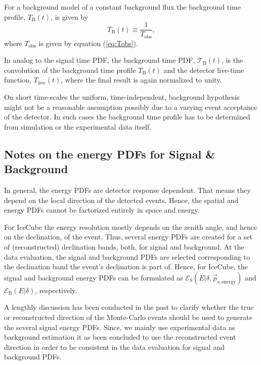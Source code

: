 \documentclass{article}
\begin{document}
For a background model of a constant background flux the background time profile,
$T_{\mathrm{B}}(t)$, is given by
\begin{equation}
 T_{\mathrm{B}}(t) \equiv \frac{1}{T_{\mathrm{obs}}},
\end{equation}
where $T_{\mathrm{obs}}$ is given by equation (\ref{eq:Tobs}).

In analog to the signal time PDF, the background time PDF, $\mathcal{T}_{\mathrm{B}}(t)$,
is the convolution of the background time profile $T_{\mathrm{B}}(t)$ and the
detector live-time function, $T_{\mathrm{live}}(t)$, where the final result is
again normalized to unity.

On short time-scales the uniform, time-independent, background hypothesis might
not be a reasonable assumption possibly due to a varying event acceptance of the
detector. In such cases the background time profile has to be determined from
simulation or the experimental data itself.


\subsection{Notes on the energy PDFs for Signal \& Background}

In general, the energy PDFs are detector response dependent. That means they
depend on the local direction of the detected events. Hence, the spatial and
energy PDFs cannot be factorized entirely in space and energy.

For IceCube the energy resolution mostly depends on the zenith angle, and hence
on the declination, of the event. Thus, several energy PDFs are created for a
set of (reconstructed) declination bands, both, for signal and background. At
the data evaluation, the signal and background PDFs are selected corresponding
to the declination band the event's declination is part of. Hence, for IceCube,
the signal and background energy PDFs can be formulated as
$\mathcal{E}_{\mathrm{S}}(E|\delta,\vec{p}_{\mathrm{s,energy}})$ and
$\mathcal{E}_{\mathrm{B}}(E|\delta)$, respectively.

A lengthly discussion has been conducted in the past to clarify whether the true or
reconstructed direction of the Monte-Carlo events should be used to generate
the several signal energy PDFs. Since, we mainly use experimental data as
background estimation it as been concluded to use the reconstructed event
direction in order to be consistent in the data evaluation for signal and
background PDFs.
\end{document}
